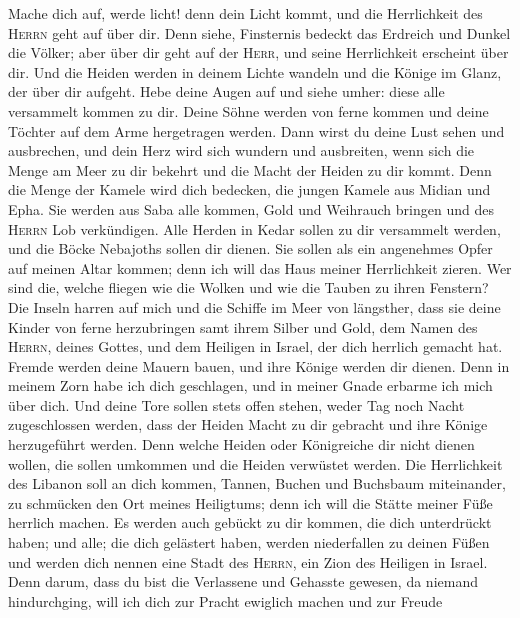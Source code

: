  Mache dich auf, werde licht! denn dein Licht kommt, und
die Herrlichkeit des \textsc{Herrn} geht auf über dir. 
Denn siehe, Finsternis bedeckt das Erdreich und Dunkel die Völker; aber
über dir geht auf der \textsc{Herr}, und seine Herrlichkeit erscheint
über dir.  Und die Heiden werden in deinem Lichte wandeln
und die Könige im Glanz, der über dir aufgeht.  Hebe deine
Augen auf und siehe umher: diese alle versammelt kommen zu dir. Deine
Söhne werden von ferne kommen und deine Töchter auf dem Arme hergetragen
werden.  Dann wirst du deine Lust sehen und ausbrechen,
und dein Herz wird sich wundern und ausbreiten, wenn sich die Menge am
Meer zu dir bekehrt und die Macht der Heiden zu dir kommt.
 Denn die Menge der Kamele wird dich bedecken, die jungen
Kamele aus Midian und Epha. Sie werden aus Saba alle kommen, Gold und
Weihrauch bringen und des \textsc{Herrn} Lob verkündigen. 
Alle Herden in Kedar sollen zu dir versammelt werden, und die Böcke
Nebajoths sollen dir dienen. Sie sollen als ein angenehmes Opfer auf
meinen Altar kommen; denn ich will das Haus meiner Herrlichkeit zieren.
 Wer sind die, welche fliegen wie die Wolken und wie die
Tauben zu ihren Fenstern?  Die Inseln harren auf mich und
die Schiffe im Meer von längsther, dass sie deine Kinder von ferne
herzubringen samt ihrem Silber und Gold, dem Namen des \textsc{Herrn},
deines Gottes, und dem Heiligen in Israel, der dich herrlich gemacht
hat.  Fremde werden deine Mauern bauen, und ihre Könige
werden dir dienen. Denn in meinem Zorn habe ich dich geschlagen, und in
meiner Gnade erbarme ich mich über dich.  Und deine Tore
sollen stets offen stehen, weder Tag noch Nacht zugeschlossen werden,
dass der Heiden Macht zu dir gebracht und ihre Könige herzugeführt
werden.  Denn welche Heiden oder Königreiche dir nicht
dienen wollen, die sollen umkommen und die Heiden verwüstet werden.
 Die Herrlichkeit des Libanon soll an dich kommen,
Tannen, Buchen und Buchsbaum miteinander, zu schmücken den Ort meines
Heiligtums; denn ich will die Stätte meiner Füße herrlich machen.
 Es werden auch gebückt zu dir kommen, die dich
unterdrückt haben; und alle; die dich gelästert haben, werden
niederfallen zu deinen Füßen und werden dich nennen eine Stadt des
\textsc{Herrn}, ein Zion des Heiligen in Israel.  Denn
darum, dass du bist die Verlassene und Gehasste gewesen, da niemand
hindurchging, will ich dich zur Pracht ewiglich machen und zur Freude
